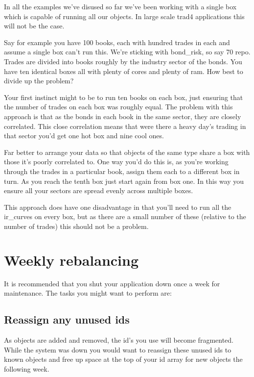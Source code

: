 \documentclass{report}
\begin{document}
In all the examples we've disused so far we've been working with a single box which is capable of running  all our objects. In large scale trad4 applications this will not be the case.

Say for example you have 100 books, each with hundred trades in each and assume a single box can't run this. We're sticking with bond_risk, so say 70%
repo. Trades are divided into books roughly by the industry sector of the bonds. You have ten identical boxes all with plenty of cores and plenty of ram. How best to divide up the problem?

Your first instinct might to be to run ten books on each box, just ensuring that the number of trades on each box was roughly equal. The problem with this approach is that as the bonds in each book in the same sector, they are closely correlated. This close correlation means that were there a heavy day's trading in that sector you'd get one hot box and nine cool ones.

Far better to arrange your data so that objects of the same type share a box with those it's poorly correlated to. One way you'd do this is, as you're working through the trades in a particular book, assign them each to a different box in turn. As you reach the tenth box just start again from box one. In this way you ensure all your sectors are spread evenly across multiple boxes.

This approach does have one disadvantage in that you'll need to run all the ir_curves on every box, but as there are a small number of these (relative to the number of trades) this should not be a problem.

\section{Weekly rebalancing}

It is recommended that you shut your application down once a week for maintenance. The tasks you might want to perform are:

\subsection{Reassign any unused ids}

As objects are added and removed, the id's you use will become fragmented. While the system was down you would want to reassign these unused ids to known objects and free up space at the top of your id array for new objects the following week.
\end{document}
